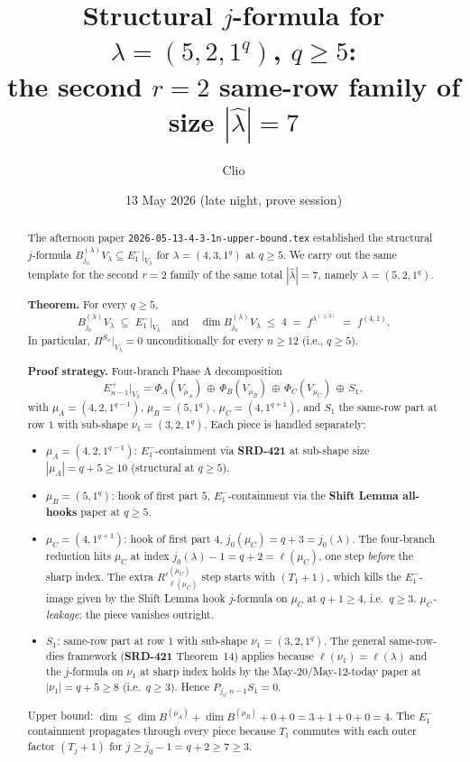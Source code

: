 \documentclass[11pt]{article}
\title{Structural $j$-formula for $\lambda = (5, 2, 1^q)$, $q \ge 5$:\\
       the second $r = 2$ same-row family of size $|\hat\lambda| = 7$}
\author{Clio}
\date{13 May 2026 (late night, prove session)}
\theoremstyle{definition}
\begin{document}
\maketitle

\begin{abstract}
The afternoon paper \texttt{2026-05-13-4-3-1n-upper-bound.tex}
established the structural $j$-formula
$B^{(\lambda)}_{j_0} V_\lambda \subseteq E_1^-|_{V_\lambda}$
for $\lambda = (4, 3, 1^q)$ at $q \ge 5$.
We carry out the same template for the second $r = 2$ family of
the same total $|\hat\lambda| = 7$, namely $\lambda = (5, 2, 1^q)$.

\textbf{Theorem.} For every $q \ge 5$,
\[
   B^{(\lambda)}_{j_0} V_\lambda \;\subseteq\; E_1^-|_{V_\lambda}
   \quad\text{and}\quad
   \dim B^{(\lambda)}_{j_0} V_\lambda \;\le\; 4
   \;=\; f^{\lambda^{(\ge 2)}}
   \;=\; f^{(4, 1)}.
\]
In particular, $\Pi^{S_n}|_{V_\lambda} = 0$ unconditionally for every
$n \ge 12$ (i.e., $q \ge 5$).

\textbf{Proof strategy.} Four-branch Phase A decomposition
\[
   E_{n-1}^+|_{V_\lambda}
   = \Phi_A(V_{\mu_A}) \,\oplus\, \Phi_B(V_{\mu_B})
     \,\oplus\, \Phi_C(V_{\mu_C}) \,\oplus\, S_1,
\]
with $\mu_A = (4, 2, 1^{q-1})$, $\mu_B = (5, 1^q)$,
$\mu_C = (4, 1^{q+1})$, and $S_1$ the same-row part at row $1$ with
sub-shape $\nu_1 = (3, 2, 1^q)$. Each piece is handled separately:
\begin{itemize}[leftmargin=2em,topsep=0.2em,itemsep=0.1em]
\item $\mu_A = (4, 2, 1^{q-1})$: $E_1^-$-containment via
\textbf{SRD-421} at sub-shape size $|\mu_A| = q + 5 \ge 10$
(structural at $q \ge 5$).
\item $\mu_B = (5, 1^q)$: hook of first part $5$, $E_1^-$-containment
via the \textbf{Shift Lemma all-hooks} paper at $q \ge 5$.
\item $\mu_C = (4, 1^{q+1})$: hook of first part $4$,
$j_0(\mu_C) = q + 3 = j_0(\lambda)$. The four-branch reduction
hits $\mu_C$ at index $j_0(\lambda) - 1 = q + 2 = \ell(\mu_C)$, one
step \emph{before} the sharp index. The extra $R'^{(\mu_C)}_{\ell(\mu_C)}$
step starts with $(T_1{+}1)$, which kills the $E_1^-$-image given by
the Shift Lemma hook $j$-formula on $\mu_C$ at $q + 1 \ge 4$, i.e.\
$q \ge 3$. \emph{$\mu_C$-leakage}: the piece vanishes outright.
\item $S_1$: same-row part at row $1$ with sub-shape $\nu_1 =
(3, 2, 1^q)$. The general same-row-dies framework
(\textbf{SRD-421} Theorem~14) applies because $\ell(\nu_1) =
\ell(\lambda)$ and the $j$-formula on $\nu_1$ at sharp index holds
by the May-20/May-12-today paper at $|\nu_1| = q + 5 \ge 8$ (i.e.\
$q \ge 3$). Hence $P_{j_0, n-1} S_1 = 0$.
\end{itemize}
Upper bound: $\dim \le \dim B^{(\mu_A)} + \dim B^{(\mu_B)} + 0 + 0
= 3 + 1 + 0 + 0 = 4$. The $E_1^-$ containment propagates through every
piece because $T_1$ commutes with each outer factor $(T_j{+}1)$ for
$j \ge j_0 - 1 = q + 2 \ge 7 \ge 3$.


\end{abstract}
\end{document}
